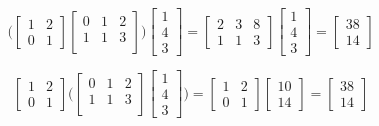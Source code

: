 \begin{enumerate}[label=1.\arabic*]
    \begin{mysolution}
        \[
            \bigg(\begin{bmatrix}
              1 & 2 \\
              0 & 1
            \end{bmatrix}
            \begin{bmatrix}
              0 & 1 & 2 \\
              1 & 1 & 3 \\
            \end{bmatrix}\bigg)
            \begin{bmatrix}
              1 \\ 4 \\ 3
            \end{bmatrix}
            =
            \begin{bmatrix}
                2 & 3 & 8 \\
                1 & 1 & 3
            \end{bmatrix}
            \begin{bmatrix}
                1 \\ 4 \\ 3
              \end{bmatrix}
            =
            \begin{bmatrix}
                38 \\
                14
            \end{bmatrix}
          \]

        \[
            \begin{bmatrix}
                1 & 2 \\
                0 & 1
              \end{bmatrix}\bigg(
              \begin{bmatrix}
                0 & 1 & 2 \\
                1 & 1 & 3 \\
              \end{bmatrix}
              \begin{bmatrix}
                1 \\ 4 \\ 3
              \end{bmatrix}\bigg)
              = \begin{bmatrix}
                1 & 2 \\
                0 & 1
              \end{bmatrix}
              \begin{bmatrix}
                10 \\ 14
              \end{bmatrix}
              = \begin{bmatrix}
                38 \\ 14
              \end{bmatrix}
        \]
    \end{mysolution}

\end{enumerate}